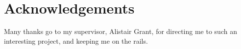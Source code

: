 \documentclass[a4paper,12pt]{article}
\begin{document}
  \section*{Acknowledgements}
    Many thanks go to my supervisor, Alistair Grant, for directing me to such an interesting project, and keeping me on the rails.
  \pagebreak
  \setcounter{page}{1}
  \pagestyle{plain}
  
  
  
  
  
  
  
  
  
  \pagebreak
  \pagestyle{empty}
  \nocite{opencvcheatsheet}
  
  
\end{document}
